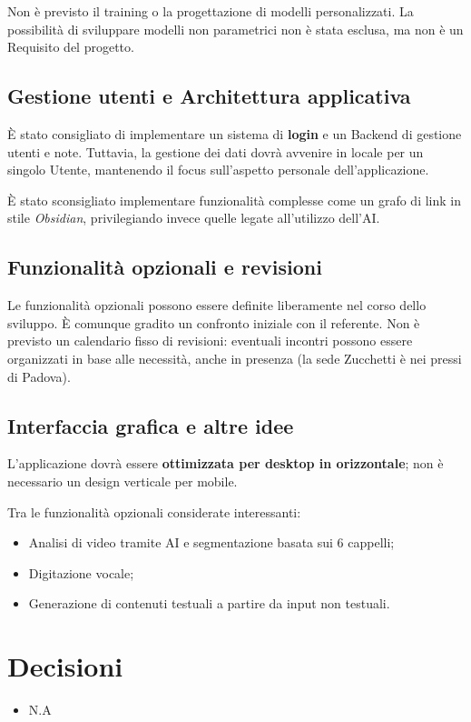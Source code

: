 \documentclass[a4paper,12pt]{article}
\begin{document}
Non è previsto il training o la progettazione di modelli personalizzati. La possibilità di sviluppare modelli non parametrici non è stata esclusa, ma non è un Requisito del progetto.

\subsection{Gestione utenti e \texorpdfstring{Architettura}{Architettura} applicativa}
È stato consigliato di implementare un sistema di \textbf{login} e un Backend di gestione utenti e note. Tuttavia, la gestione dei dati dovrà avvenire in locale per un singolo Utente, mantenendo il focus sull’aspetto personale dell’applicazione.

È stato sconsigliato implementare funzionalità complesse come un grafo di link in stile \textit{Obsidian}, privilegiando invece quelle legate all’utilizzo dell’AI.

\subsection{Funzionalità opzionali e revisioni}
Le funzionalità opzionali possono essere definite liberamente nel corso dello sviluppo. È comunque gradito un confronto iniziale con il referente.
Non è previsto un calendario fisso di revisioni: eventuali incontri possono essere organizzati in base alle necessità, anche in presenza (la sede Zucchetti è nei pressi di Padova).

\subsection{Interfaccia grafica e altre idee}
L’applicazione dovrà essere \textbf{ottimizzata per desktop in orizzontale}; non è necessario un design verticale per mobile.

Tra le funzionalità opzionali considerate interessanti:
\begin{itemize}
    \item Analisi di video tramite AI e segmentazione basata sui 6 cappelli;
    \item Digitazione vocale;
    \item Generazione di contenuti testuali a partire da input non testuali.
\end{itemize}

\section{Decisioni}
\begin{itemize}
    \item N.A
\end{itemize}
\end{document}

